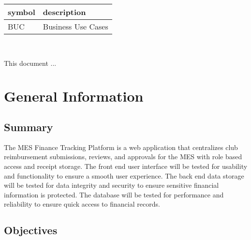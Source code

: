 \documentclass[12pt, titlepage]{article}
\begin{document}
\renewcommand{\arraystretch}{1.2}
\begin{tabular}{l l} 
  \toprule		
  \textbf{symbol} & \textbf{description}\\
  \midrule 
  BUC & Business Use Cases\\
  \bottomrule
\end{tabular}\\



\newpage


This document ... 

\section{General Information}

\subsection{Summary}


The MES Finance Tracking Platform is a web application that centralizes club reimbursement submissions, 
reviews, and approvals for the MES with role based access and receipt storage. The front end user interface 
will be tested for usability and functionality to ensure a smooth user experience. The back end data storage
will be tested for data integrity and security to ensure sensitive financial information is protected. The database
will be tested for performance and reliability to ensure quick access to financial records. 

\subsection{Objectives}

\end{document}
